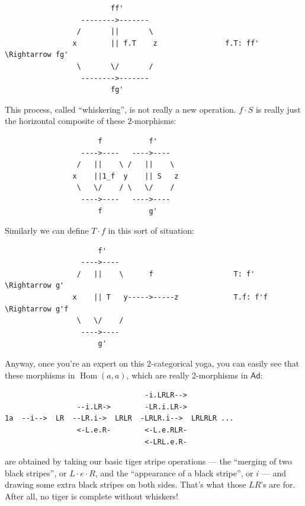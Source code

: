 \documentclass{article}
\begin{document}
\begin{verbatim}
                         ff'
                  -------->-------
                 /       ||       \
                x        || f.T    z                f.T: ff' \Rightarrow fg'
                 \       \/       /
                  -------->-------
                         fg'
\end{verbatim}

This process, called ``whiskering'', is not really a new operation.
\(f\cdot S\) is really just the horizontal composite of these
\(2\)-morphisms:

\begin{verbatim}
                      f           f'
                  ---->----   ---->----  
                 /   ||    \ /   ||    \              
                x    ||1_f  y    || S   z             
                 \   \/    / \   \/    /
                  ---->----   ---->----
                      f           g'
\end{verbatim}

Similarly we can define \(T\cdot f\) in this sort of situation:

\begin{verbatim}
                      f'           
                  ---->----   
                 /   ||    \      f                   T: f' \Rightarrow g'
                x    || T   y----->-----z             T.f: f'f \Rightarrow g'f
                 \   \/    /
                  ---->---- 
                      g'     
\end{verbatim}

Anyway, once you're an expert on this \(2\)-categorical yoga, you can
easily see that these morphisms in \(\operatorname{Hom}(a,a)\), which
are really 2-morphisms in \(\mathsf{Ad}\):

\begin{verbatim}
                                 -i.LRLR-->
                 --i.LR->        -LR.i.LR->
1a  --i-->  LR  --LR.i->  LRLR  -LRLR.i-->  LRLRLR ...
                 <-L.e.R-        <-L.e.RLR-
                                 <-LRL.e.R-
\end{verbatim}

are obtained by taking our basic tiger stripe operations --- the
``merging of two black stripes'', or \(L\cdot e\cdot R\), and the
``appearance of a black stripe'', or \(i\) --- and drawing some extra
black stripes on both sides. That's what those \(LR\)'s are for. After
all, no tiger is complete without whiskers!
\end{document}
